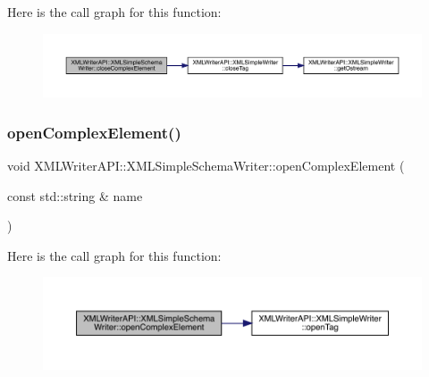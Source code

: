 Here is the call graph for this function\+:
\nopagebreak
\begin{figure}[H]
\begin{center}
\leavevmode
\includegraphics[width=350pt]{db/d0b/classXMLWriterAPI_1_1XMLSimpleSchemaWriter_a48be6d4cbc08f03e9e76fa94107c4b8a_cgraph}
\end{center}
\end{figure}
\mbox{\label{classXMLWriterAPI_1_1XMLSimpleSchemaWriter_a136a57c1860b0baa0fd6b877f4dce4bc}} 
\subsubsection{\texorpdfstring{openComplexElement()}{openComplexElement()}\hspace{0.1cm}{\footnotesize\ttfamily [1/3]}}
{\footnotesize\ttfamily void X\+M\+L\+Writer\+A\+P\+I\+::\+X\+M\+L\+Simple\+Schema\+Writer\+::open\+Complex\+Element (\begin{DoxyParamCaption}\item[{const std\+::string \&}]{name }\end{DoxyParamCaption})\hspace{0.3cm}{\ttfamily [inline]}}

Here is the call graph for this function\+:
\nopagebreak
\begin{figure}[H]
\begin{center}
\leavevmode
\includegraphics[width=350pt]{db/d0b/classXMLWriterAPI_1_1XMLSimpleSchemaWriter_a136a57c1860b0baa0fd6b877f4dce4bc_cgraph}
\end{center}
\end{figure}
\mbox{\label{classXMLWriterAPI_1_1XMLSimpleSchemaWriter_a136a57c1860b0baa0fd6b877f4dce4bc}} 

